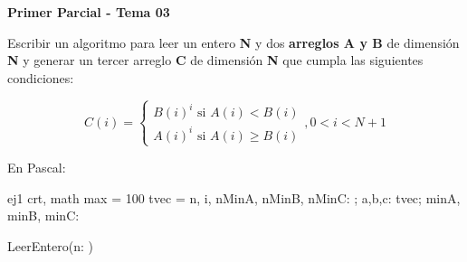 \documentclass[answers]{exam}
\begin{document}

\textbf{Primer Parcial - Tema 03}

\begin{questions}

\question Escribir un algoritmo para leer un entero \textbf{N} y dos \textbf{arreglos A y B} de dimensión \textbf{N} y generar un tercer arreglo \textbf{C} de dimensión \textbf{N} que cumpla las siguientes condiciones:

\begin{equation*}
C(i) = 
\left\{
\begin{array}{ll}
B(i)^i \text{ si } A(i) < B(i) \\
A(i)^i \text{ si } A(i) \geq B(i)
\end{array}
\right., 0 < i < N+1
\end{equation*}


\renewcommand{\solutiontitle}{\noindent\textbf{Solución:}\enspace}


\begin{solution}
En Pascal:

\begin{algorithm}[H]
\Program{} ej1\;
\Uses crt, math\;
\Const max = 100\;
\Type tvec = \Array [1..max] \Of \Real\;
\Var n, i, nMinA, nMinB, nMinC: \Integer; a,b,c: tvec; minA, minB, minC: \Real\;

\BlankLine

\Procedure{} LeerEntero(\Var n: \Integer)\;
\Begin\


\end{algorithm}
\end{solution}
\end{questions}
\end{document}
